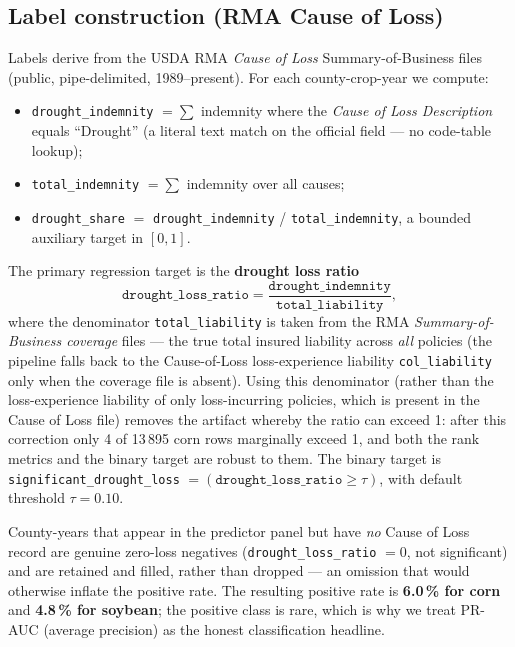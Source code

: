 \documentclass[essd, manuscript]{copernicus}
\begin{document}
\subsection{Label construction (RMA Cause of Loss)}
\label{sec:labels}
Labels derive from the USDA RMA \emph{Cause of Loss} Summary-of-Business files \citep{usda_rma_col} (public, pipe-delimited, 1989--present). For each county-crop-year we compute:
\begin{itemize}
\item \texttt{drought\_indemnity} $= \sum$ indemnity where the \emph{Cause of Loss Description} equals ``Drought'' (a literal text match on the official field --- no code-table lookup);
\item \texttt{total\_indemnity} $= \sum$ indemnity over all causes;
\item \texttt{drought\_share} $=$ \texttt{drought\_indemnity} / \texttt{total\_indemnity}, a bounded auxiliary target in $[0, 1]$.
\end{itemize}
The primary regression target is the \textbf{drought loss ratio}
\[
\texttt{drought\_loss\_ratio} = \frac{\texttt{drought\_indemnity}}{\texttt{total\_liability}},
\]
where the denominator \texttt{total\_liability} is taken from the RMA \emph{Summary-of-Business coverage} files --- the true total insured liability across \emph{all} policies (the pipeline falls back to the Cause-of-Loss loss-experience liability \texttt{col\_liability} only when the coverage file is absent). Using this denominator (rather than the loss-experience liability of only loss-incurring policies, which is present in the Cause of Loss file) removes the artifact whereby the ratio can exceed 1: after this correction only 4 of 13\,895 corn rows marginally exceed 1, and both the rank metrics and the binary target are robust to them. The binary target is \texttt{significant\_drought\_loss} $= (\texttt{drought\_loss\_ratio} \geq \tau)$, with default threshold $\tau = 0.10$.

County-years that appear in the predictor panel but have \emph{no} Cause of Loss record are genuine zero-loss negatives (\texttt{drought\_loss\_ratio} $= 0$, not significant) and are retained and filled, rather than dropped --- an omission that would otherwise inflate the positive rate. The resulting positive rate is \textbf{6.0\,\% for corn} and \textbf{4.8\,\% for soybean}; the positive class is rare, which is why we treat PR-AUC (average precision) as the honest classification headline.
\end{document}
